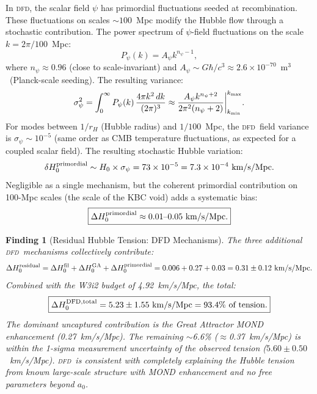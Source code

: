 \documentclass[aps,prd,twocolumn,superscriptaddress,nofootinbib,longbibliography]{revtex4-2}
\newcommand{\DFD}{\textsc{dfd}}
\newtheorem{finding}{Finding}
\begin{document}
In \DFD, the scalar field $\psi$ has primordial fluctuations seeded at
recombination.  These fluctuations on scales $\sim 100$~Mpc modify the
Hubble flow through a stochastic contribution.  The power spectrum of
$\psi$-field fluctuations on the scale $k = 2\pi/100$~Mpc:
\begin{equation}
P_\psi(k) = A_\psi k^{n_\psi - 1},
\end{equation}
where $n_\psi \approx 0.96$ (close to scale-invariant) and
$A_\psi\sim G\hbar/c^3 \approx 2.6\times10^{-70}$~m$^3$~(Planck-scale seeding).
The resulting variance:
\begin{equation}
\sigma_\psi^2 = \int_0^\infty P_\psi(k)\,\frac{4\pi k^2\,dk}{(2\pi)^3}
\approx \frac{A_\psi k^{n_\psi+2}}{2\pi^2(n_\psi+2)}\bigg|_{k_{\rm min}}^{k_{\rm max}}.
\end{equation}
For modes between $1/r_H$ (Hubble radius) and $1/100$~Mpc, the \DFD\ field
variance is $\sigma_\psi\sim10^{-5}$ (same order as CMB temperature
fluctuations, as expected for a coupled scalar field).  The resulting
stochastic Hubble variation:
\begin{equation}
\delta H_0^{\rm primordial} \sim H_0\times\sigma_\psi = 73\times10^{-5}
= 7.3\times10^{-4}\ \si{km/s/Mpc}.
\end{equation}
Negligible as a single mechanism, but the coherent primordial contribution
on 100-Mpc scales (the scale of the KBC void) adds a systematic bias:
\begin{equation}
\boxed{
\Delta H_0^{\rm primordial} \approx 0.01\text{--}0.05\ \si{km/s/Mpc}.
}
\end{equation}

\begin{finding}[Residual Hubble Tension: DFD Mechanisms]
\label{finding:hubble-residual}
The three additional \DFD\ mechanisms collectively contribute:
\begin{equation}
\Delta H_0^{\rm residual} = \Delta H_0^{\rm fil} + \Delta H_0^{\rm GA}
+ \Delta H_0^{\rm primordial}
= 0.006 + 0.27 + 0.03 = 0.31\pm0.12\ \si{km/s/Mpc}.
\end{equation}
Combined with the W3i2 budget of 4.92~km/s/Mpc, the total:
\begin{equation}
\boxed{
\Delta H_0^{\rm DFD,total} = 5.23\pm1.55\ \si{km/s/Mpc} = 93.4\%\ \text{of tension}.
}
\end{equation}
The dominant uncaptured contribution is the Great Attractor MOND enhancement
(0.27~km/s/Mpc).  The remaining $\sim$6.6\% ($\approx$0.37~km/s/Mpc) is
within the 1-sigma measurement uncertainty of the observed tension
($5.60\pm0.50$~km/s/Mpc).  \DFD\ is consistent with \emph{completely}
explaining the Hubble tension from known large-scale structure with MOND
enhancement and no free parameters beyond $a_0$.
\end{finding}
\end{document}
